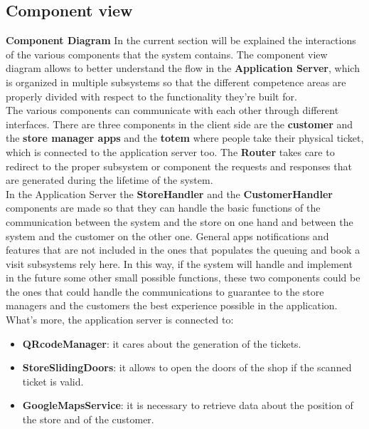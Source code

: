 \documentclass[]{article}
\begin{document}
	\subsection{Component view}
	\textbf{} \newline
	\textbf{Component Diagram} \newline
	In the current section will be explained the interactions of the various components that the system contains. The component view diagram allows to better understand the flow in the \textbf{Application Server}, which is organized in multiple subsystems so that the different competence areas are properly divided with respect to the functionality they’re built for.\\
The various components can communicate with each other through different interfaces. 
There are three components in the client side are the \textbf{customer} and the \textbf{store manager apps} and the \textbf{totem} where people take their physical ticket, which is connected to the application server too. The \textbf{Router} takes care to redirect to the proper subsystem or component the requests and responses that are generated during the lifetime of the system.\\
In the Application Server the \textbf{StoreHandler} and the \textbf{CustomerHandler} components are made so that they can handle the basic functions of the communication between the system and the store on one hand and between the system and the customer on the other one. General apps notifications and features that are not included in the ones that populates the queuing and book a visit subsystems rely here. In this way, if the system will handle and implement in the future some other small possible functions, these two components could be the ones that could handle the communications to guarantee to the store managers and the customers the best experience possible in the application.\newline\newline
What’s more, the application server is connected to:\\
	\begin{itemize}
		\item 	\textbf{QRcodeManager}: it cares about the generation of the tickets.
		
		\item 	\textbf{StoreSlidingDoors}: it allows to open the doors of the shop if the scanned ticket is valid.
		
		\item 	\textbf{GoogleMapsService}: it is necessary to retrieve data about the position of the store and of the customer.	
	
	\end{itemize}
	
\end{document}

